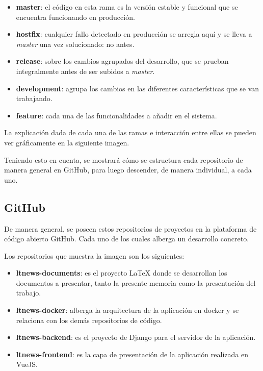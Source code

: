 \begin{itemize}
    \item \textbf{master}: el código en esta rama es la versión estable y funcional que se encuentra funcionando en producción.
    \item \textbf{hostfix}: cualquier fallo detectado en producción se arregla aquí y se lleva a \textit{master} una vez solucionado: no antes.
    \item \textbf{release}: sobre los cambios agrupados del desarrollo, que se prueban integralmente antes de ser subidos a \textit{master}.
    \item \textbf{development}: agrupa los cambios en las diferentes características que se van trabajando.
    \item \textbf{feature}: cada una de las funcionalidades a añadir en el sistema.
\end{itemize}

La explicación dada de cada una de las ramas e interacción entre ellas se pueden ver gráficamente en la siguiente imagen.


Teniendo esto en cuenta, se mostrará cómo se estructura cada repositorio de manera general en GitHub, para luego descender, de manera individual, a cada uno.

\subsection{GitHub}

De manera general, se poseen estos repositorios de proyectos en la plataforma de código abierto GitHub. Cada uno de los cuales alberga un desarrollo concreto.


Los repositorios que muestra la imagen son los siguientes:

\begin{itemize}
    \item \textbf{ltnews-documents}: es el proyecto LaTeX donde se desarrollan los documentos a presentar, tanto la presente memoria como la presentación del trabajo.
    \item \textbf{ltnews-docker}: alberga la arquitectura de la aplicación en docker y se relaciona con los demás repositorios de código.
    \item \textbf{ltnews-backend}: es el proyecto de Django para el servidor de la aplicación.
    \item \textbf{ltnews-frontend}: es la capa de presentación de la aplicación
     realizada en VueJS.
\end{itemize}

